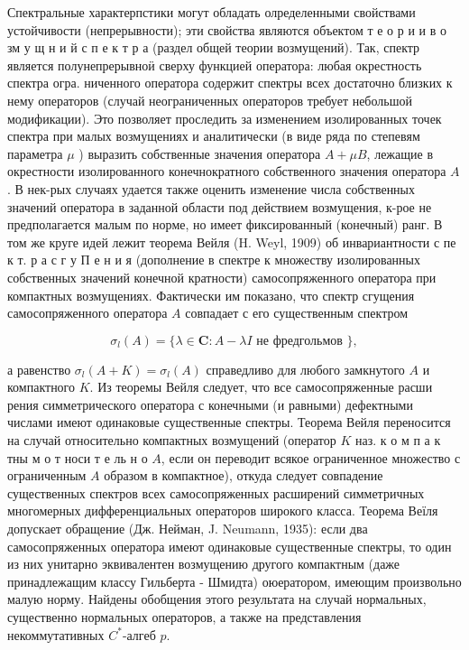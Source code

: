 \documentclass[10pt]{article}
\begin{document}
Спектральные характерпстики могут обладать олределенными свойствами устойчивости (непрерывности); эти свойства являются объектом т е о р и и в о зм у щ н и й с п е к т р а (раздел общей теории возмущений). Так, спектр является полунепрерывноӥ сверху функцией оператора: любая окрестность спектра огра. ниченного оператора содержит спектры всех достаточно близких к нему операторов (случай неограниченных операторов требует небольшой модификации). Это позволяет проследить за изменением изолированных точек спектра при малых возмущениях и аналитически (в виде ряда по степевям параметра $\mu$ ) выразить собственные значения оператора $A+\mu B$, лежащие в окрестности изолированного конечнократного собственного значения оператора $A$. В нек-рых случаях удается также оценить изменение числа собственных значений оператора в заданной области под действием возмущения, к-рое не предполагается малым по норме, но имеет фиксированный (конечный) ранг. В том же круге идей лежит теорема Вейля (H. Weyl, 1909) об инвариантности с пе к т. р а с г у П е н и я (дополнение в спектре к множеству изолированных собственных значений конечной кратности) самосопряженного оператора при компактных возмущениях. Фактически им показано, что спектр сгущения самосопряженного оператора $A$ совпадает с его существенным спектром



\[

\sigma_{l}(A)=\{\lambda \in \mathbf{C}: A-\lambda I \text { не фредгольмов }\},

\]



а равенство $\sigma_{l}(A+K)=\sigma_{l}(A)$ справедливо для любого замкнутого $A$ и компактного $K$. Из теоремы Вейля следует, что все самосопряженные расши рения симметрического оператора с конечными (и равными) дефектными числами имеют одинаковые существенные спектры. Теорема Вейля переносится на случай относительно компактных возмущений (оператор $K$ наз. к о м п а к тны м о т носи т е ль н о $A$, если он переводит всякое ограниченное множество с ограниченным $A$ образом в компактное), откуда следует совпадение существенных спектров всех самосопряженных расширений симметричных многомерных дифференциальных операторов широкого класса. Теорема Веїля допускает обращение (Дж. Нейман, J. Neumann, 1935): если два самосопряженных оператора имеют одинаковые существенные спектры, то один из них унитарно эквивалентен возмущению другого компактным (даже принадлежащим классу Гильберта - Шмидта) оюератором, имеющим произвольно малую норму. Найдены обобщения этого результата на случай нормальных, существенно нормальных операторов, а также на представления некоммутативных $C^{*}$-алгеб $p$.
\end{document}
